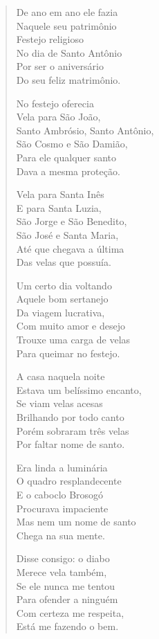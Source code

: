 \begin{verse}
De ano em ano ele fazia\\
Naquele seu patrimônio\\
Festejo religioso\\
No dia de Santo Antônio\\
Por ser o aniversário\\
Do seu feliz matrimônio.

No festejo oferecia\\
Vela para São João,\\
Santo Ambrósio, Santo Antônio,\\
São Cosmo e São Damião,\\
Para ele qualquer santo\\
Dava a mesma proteção.

Vela para Santa Inês\\
E para Santa Luzia,\\
São Jorge e São Benedito,\\
São José e Santa Maria,\\
Até que chegava a última\\
Das velas que possuía.

Um certo dia voltando\\
Aquele bom sertanejo\\
Da viagem lucrativa,\\
Com muito amor e desejo\\
Trouxe uma carga de velas\\
Para queimar no festejo.

A casa naquela noite\\
Estava um belíssimo encanto,\\
Se viam velas acesas\\
Brilhando por todo canto\\
Porém sobraram três velas\\
Por faltar nome de santo.

Era linda a luminária\\
O quadro resplandecente\\
E o caboclo Brosogó\\
Procurava impaciente\\
Mas nem um nome de santo\\
Chega na sua mente.

Disse consigo: o diabo\\
Merece vela também,\\
Se ele nunca me tentou\\
Para ofender a ninguém\\
Com certeza me respeita,\\
Está me fazendo o bem.


\end{verse}
